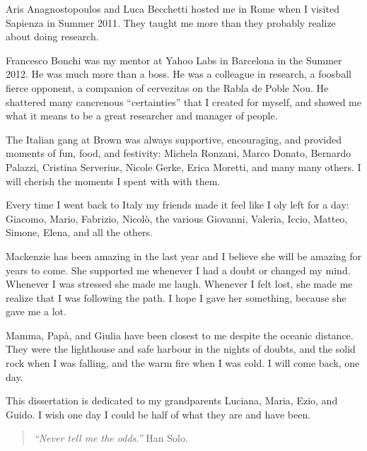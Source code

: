 Aris Anagnostopoulos and Luca Becchetti hosted me in Rome when I visited
Sapienza in Summer 2011. They taught me more than they probably realize about
doing research. 

Francesco Bonchi was my mentor at Yahoo Labs in Barcelona in the Summer 2012. He
was much more than a boss. He was a colleague in research, a foosball fierce
opponent, a companion of cervezitas on the Rabla de Poble Nou.  He shattered
many cancrenous ``certainties'' that I created for myself, and showed me what it
means to be a great researcher and manager of people.

The Italian gang at Brown was always supportive, encouraging, and provided
moments of fun, food, and festivity:  Michela Ronzani, Marco Donato, Bernardo
Palazzi, Cristina Serverius, Nicole Gerke, Erica Moretti, and many many others.
I will cherish the moments I spent with with them.

Every time I went back to Italy my friends made it feel like I oly
left for a day: Giacomo, Mario, Fabrizio, Nicol\`o, the various Giovanni,
Valeria, Iccio, Matteo, Simone, Elena, and all the others. 

Mackenzie has been amazing in the last year and I believe she will be
amazing for years to come. She supported me whenever I had a doubt or changed
my mind. Whenever I was stressed she made me laugh. Whenever I felt lost, she
made me realize that I was following the path. I hope I gave her something,
because she gave me a lot.

Mamma, Pap\`a, and Giulia have been closest to me despite the oceanic distance.
They were the lighthouse and safe harbour in the nights of doubts, and the solid
rock when I was falling, and the warm fire when I was cold. I will come back,
one day.

This dissertation is dedicated to my grandparents Luciana, Maria, Ezio, and
Guido. I wish one day I could be half of what they are and have been.

\begin{quote}
  {\em ``Never tell me the odds.''} Han Solo.
\end{quote}

